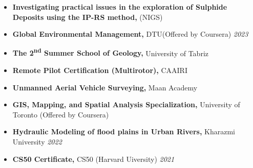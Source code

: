 \documentclass[letterpaper,11pt]{article}
\begin{document}
	\vspace{-1.2em}
	\begin{itemize}[left=0pt, label={}, topsep=7.5pt, partopsep=0pt, itemsep=6pt, parsep=0pt]
		\item \textbf{Investigating practical issues in the exploration of Sulphide Deposits using the IP-RS method,} (NIGS)\footnotemark[1]
	\end{itemize}
	\vspace{-1.2em}
	\begin{itemize}[left=0pt, label={}, topsep=7.5pt, partopsep=0pt, itemsep=6pt, parsep=0pt]
		\item \textbf{Global Environmental Management,} DTU\footnotemark[2] (Offered by Coursera)  \hfill \textit{2023}
	\end{itemize}
	\vspace{-1.2em}
	\begin{itemize}[left=0pt, label={}, topsep=7.5pt, partopsep=0pt, itemsep=6pt, parsep=0pt]
	\item \textbf{The 2\textsuperscript{nd} Summer School of Geology,} University of Tabriz\hfill \textit{}
    \end{itemize}
	\vspace{-1.2em}
	\begin{itemize}[left=0pt, label={}, topsep=7.5pt, partopsep=0pt, itemsep=6pt, parsep=0pt]
		\item \textbf{Remote Pilot Certification (Multirotor),} CAAIRI\footnotemark[3] \hfill \textit{}
	\end{itemize}
	\vspace{-1.2em}
	\begin{itemize}[left=0pt, label={}, topsep=7.5pt, partopsep=0pt, itemsep=6pt, parsep=0pt]
		\item \textbf{Unmanned Aerial Vehicle Surveying,} Maan Academy  \hfill \textit{}
	\end{itemize}
	\vspace{-1.2em}
	\begin{itemize}[left=0pt, label={}, topsep=7.5pt, partopsep=0pt, itemsep=6pt, parsep=0pt]
		\item \textbf{GIS, Mapping, and Spatial Analysis Specialization,} University of Toronto (Offered by Coursera) \hfill \textit{}
	\end{itemize}
	\vspace{-1.2em}
	\begin{itemize}[left=0pt, label={}, topsep=7.5pt, partopsep=0pt, itemsep=6pt, parsep=0pt]
		\item \textbf{Hydraulic Modeling of flood plains in Urban Rivers,}  Kharazmi University \hfill \textit{2022}
	\end{itemize}
	\vspace{-1.2em}
	\begin{itemize}[left=0pt, label={}, topsep=7.5pt, partopsep=0pt, itemsep=6pt, parsep=0pt]
		\item \textbf{CS50 Certificate,}  CS50 (Harvard Uiversity) \hfill \textit{2021}
	\end{itemize}
	\vspace{-1.2em}
\end{document}
